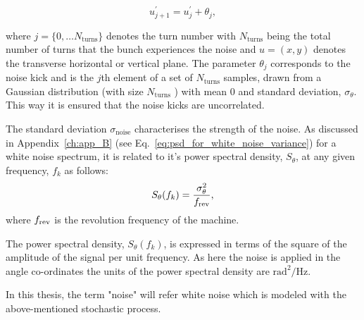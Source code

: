 \begin{equation}\label{eq:external_noise_kicks}
    u^\prime_{j+1} =  u^\prime_j + \theta_j,
\end{equation}

where $j=\{ 0,\dots N_\mathrm{turns} \}$ denotes the turn number with $N_\mathrm{turns}$ being the total number of turns that the bunch experiences the noise and $u=(x,y)$ denotes the transverse horizontal or vertical plane. The parameter $\theta_j$ corresponds to the noise kick and is the $j$th element of a set of $N_\mathrm{turns}$ samples, drawn from a Gaussian distribution (with size $N_\mathrm{turns}$ ) with mean 0 and standard deviation, $\sigma_\theta$. This way it is ensured that the noise kicks are uncorrelated.

The standard deviation $\sigma_\mathrm{noise}$ characterises the strength of the noise. As discussed in Appendix~\ref{ch:app_B} (see Eq.~\eqref{eq:psd_for_white_noise_variance}) for a white noise spectrum, it is related to it's power spectral density, $S_\theta$, at any given frequency, $f_k$ as follows: 
\begin{equation}\label{eq:psd_for_white_noise_variance_dipole}
    S_\theta(f_k) = \frac{\sigma_\theta^2 } {{f_\mathrm{rev}}},
 \end{equation}
where ${f_\mathrm{rev}}$ is the revolution frequency of the machine.

The power spectral density, $S_\theta(f_k)$, is expressed in terms of the square of the amplitude of the signal per unit frequency. As here the noise is applied in the angle co-ordinates the units of the power spectral density are $\mathrm{rad^2/Hz}$.

In this thesis, the term "noise" will refer white noise which is modeled with the above-mentioned stochastic process.



